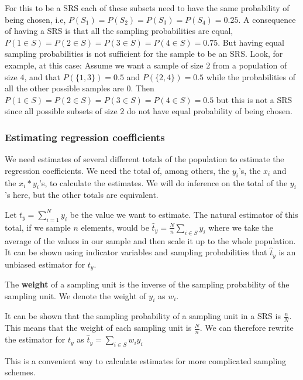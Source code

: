 \documentclass{article}
\begin{document}
For this to be a SRS each of these subsets need to have the same probability of
being chosen, i.e, \(P(S_1) = P(S_2) = P(S_3) = P(S_4) = 0.25\). A consequence of
having a SRS is that all the sampling probabilities are equal, \(P(1 \in S) =
P(2 \in S) = P(3 \in S) = P(4 \in S) = 0.75\). But having equal sampling
probabilities is not sufficient for the sample to be an SRS.
Look, for example, at this case:
Assume we want a sample of size \(2\) from a population of size \(4\), and that
\(P(\{1, 3\}) = 0.5\) and \(P(\{2, 4\}) = 0.5\) while the probabilities of all the
other possible samples are \(0\). Then \(P(1 \in S) = P(2 \in S) = P(3 \in S) = P(4 \in S) = 0.5\)
but this is not a SRS since all possible subsets of size \(2\) do not have equal
probability of being chosen.


\subsubsection{Estimating regression coefficients}

We need estimates of several different totals of the population to estimate the
regression coefficients. We need the total of, among others, the \(y_i\)'s, the
\(x_i\) and the \(x_i * y_i\)'s, to calculate the estimates.
We will do inference on the total of the \(y_i\)'s here, but the other totals
are equivalent.

Let
\(
 t_y = \sum_{i = 1}^{N} y_i
\)
be the value we want to estimate.
The natural estimator of this total, if we sample \(n\) elements, would be
\(
\hat{t}_y = \frac{N}{n}\sum_{i \in S} y_i
\)
where we take the average of the values in our sample and then scale it up to
the whole population.
It can be shown using indicator variables and sampling probabilities that
\(\hat{t}_y\) is an unbiased estimator for \(t_y\).

\begin{definition}
 The \textbf{weight} of a sampling unit is the inverse of the sampling
 probability of the sampling unit. 
 We denote the weight of \(y_i\) as \(w_i\).
\end{definition}

It can be shown that the sampling probability of a sampling unit in a SRS is
\(\frac{n}{N}\). This means that the weight of each sampling unit is
\(\frac{N}{n}\). We can therefore rewrite the estimator for \(t_y\) as
\(
\hat{t}_y = \sum_{i \in S} w_i y_i
\)

This is a convenient way to calculate estimates for more complicated sampling
schemes.
\end{document}
